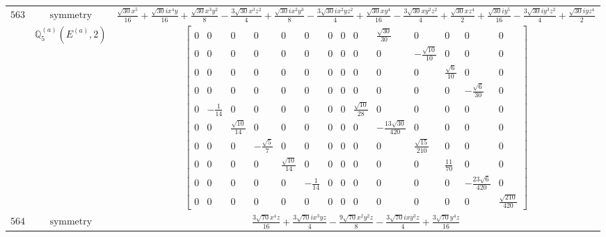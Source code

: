 \documentclass[fleqn,8pt,landscape]{jsarticle}
\begin{document}
\begin{longtable}{ccc}
$ 563 $ & $ \text{symmetry} $ & $ \frac{\sqrt{30} x^{5}}{16} + \frac{\sqrt{30} i x^{4} y}{16} + \frac{\sqrt{30} x^{3} y^{2}}{8} - \frac{3 \sqrt{30} x^{3} z^{2}}{4} + \frac{\sqrt{30} i x^{2} y^{3}}{8} - \frac{3 \sqrt{30} i x^{2} y z^{2}}{4} + \frac{\sqrt{30} x y^{4}}{16} - \frac{3 \sqrt{30} x y^{2} z^{2}}{4} + \frac{\sqrt{30} x z^{4}}{2} + \frac{\sqrt{30} i y^{5}}{16} - \frac{3 \sqrt{30} i y^{3} z^{2}}{4} + \frac{\sqrt{30} i y z^{4}}{2} $ \\
$  $ & $ \mathbb{Q}_{5}^{(a)}(E^{(a)},2) $ & $ \begin{bmatrix} 0 & 0 & 0 & 0 & 0 & 0 & 0 & 0 & 0 & \frac{\sqrt{30}}{30} & 0 & 0 & 0 & 0 \\ 0 & 0 & 0 & 0 & 0 & 0 & 0 & 0 & 0 & 0 & - \frac{\sqrt{10}}{10} & 0 & 0 & 0 \\ 0 & 0 & 0 & 0 & 0 & 0 & 0 & 0 & 0 & 0 & 0 & \frac{\sqrt{6}}{10} & 0 & 0 \\ 0 & 0 & 0 & 0 & 0 & 0 & 0 & 0 & 0 & 0 & 0 & 0 & - \frac{\sqrt{6}}{30} & 0 \\ 0 & - \frac{1}{14} & 0 & 0 & 0 & 0 & 0 & 0 & \frac{\sqrt{10}}{28} & 0 & 0 & 0 & 0 & 0 \\ 0 & 0 & \frac{\sqrt{10}}{14} & 0 & 0 & 0 & 0 & 0 & 0 & - \frac{13 \sqrt{30}}{420} & 0 & 0 & 0 & 0 \\ 0 & 0 & 0 & - \frac{\sqrt{5}}{7} & 0 & 0 & 0 & 0 & 0 & 0 & \frac{\sqrt{15}}{210} & 0 & 0 & 0 \\ 0 & 0 & 0 & 0 & \frac{\sqrt{10}}{14} & 0 & 0 & 0 & 0 & 0 & 0 & \frac{11}{70} & 0 & 0 \\ 0 & 0 & 0 & 0 & 0 & - \frac{1}{14} & 0 & 0 & 0 & 0 & 0 & 0 & - \frac{23 \sqrt{6}}{420} & 0 \\ 0 & 0 & 0 & 0 & 0 & 0 & 0 & 0 & 0 & 0 & 0 & 0 & 0 & \frac{\sqrt{210}}{420} \end{bmatrix} $ \\ \hline
$ 564 $ & $ \text{symmetry} $ & $ \frac{3 \sqrt{70} x^{4} z}{16} + \frac{3 \sqrt{70} i x^{3} y z}{4} - \frac{9 \sqrt{70} x^{2} y^{2} z}{8} - \frac{3 \sqrt{70} i x y^{3} z}{4} + \frac{3 \sqrt{70} y^{4} z}{16} $ \\

\end{longtable}
\end{document}
